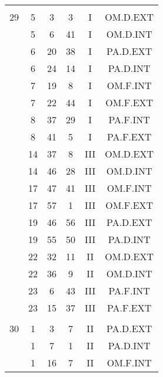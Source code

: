 \documentclass[12pt, a4paper]{article}
\begin{document}
\begin{multicols}{3}
{\begin{tabular}{c c c c c c}
	 	 	 	 & & & & & \\%
	 	 	 	29 & 5 & 3 & 3 & I & OM.D.EXT\\%
	 	 	 	 & 5 & 6 & 41 & I & OM.D.INT\\%
	 	 	 	 & 6 & 20 & 38 & I & PA.D.EXT\\%
	 	 	 	 & 6 & 24 & 14 & I & PA.D.INT\\%
	 	 	 	 & 7 & 19 & 8 & I & OM.F.INT\\%
	 	 	 	 & 7 & 22 & 44 & I & OM.F.EXT\\%
	 	 	 	 & 8 & 37 & 29 & I & PA.F.INT\\%
	 	 	 	 & 8 & 41 & 5 & I & PA.F.EXT\\%
	 	 	 	 & 14 & 37 & 8 & III & OM.D.EXT\\%
	 	 	 	 & 14 & 46 & 28 & III & OM.D.INT\\%
	 	 	 	 & 17 & 47 & 41 & III & OM.F.INT\\%
	 	 	 	 & 17 & 57 & 1 & III & OM.F.EXT\\%
	 	 	 	 & 19 & 46 & 56 & III & PA.D.EXT\\%
	 	 	 	 & 19 & 55 & 50 & III & PA.D.INT\\%
	 	 	 	 & 22 & 32 & 11 & II & OM.D.EXT\\%
	 	 	 	 & 22 & 36 & 9 & II & OM.D.INT\\%
	 	 	 	 & 23 & 6 & 43 & III & PA.F.INT\\%
	 	 	 	 & 23 & 15 & 37 & III & PA.F.EXT\\%
	 	 	 	 & & & & & \\%
	 	 	 	30 & 1 & 3 & 7 & II & PA.D.EXT\\%
	 	 	 	 & 1 & 7 & 1 & II & PA.D.INT\\%
	 	 	 	 & 1 & 16 & 7 & II & OM.F.INT\\%

\end{tabular}}
\end{multicols}
\end{document}
